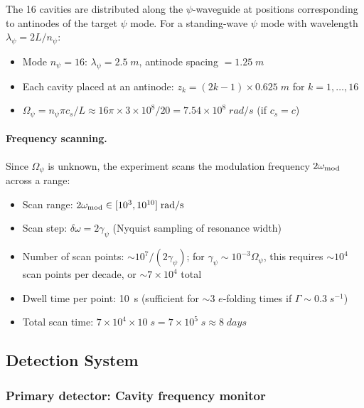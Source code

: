 \documentclass[aps,prd,twocolumn,superscriptaddress,floatfix,nofootinbib]{revtex4-2}
\newcommand{\Opsi}{\Omega_\psi}
\newcommand{\gpsi}{\gamma_\psi}
\begin{document}
The 16 cavities are distributed along the $\psi$-waveguide at
positions corresponding to antinodes of the target $\psi$ mode.
For a standing-wave $\psi$ mode with wavelength
$\lambda_\psi = 2L/n_\psi$:
\begin{itemize}[nosep]
\item Mode $n_\psi = 16$: $\lambda_\psi = 2.5\;\si{m}$,
antinode spacing $= 1.25\;\si{m}$
\item Each cavity placed at an antinode: $z_k = (2k-1)\times 0.625\;\si{m}$
for $k = 1, \ldots, 16$
\item $\Opsi = n_\psi\pi c_s/L \approx 16\pi \times 3\times10^8/20
= 7.54\times10^8\;\si{rad/s}$ (if $c_s = c$)
\end{itemize}

\paragraph{Frequency scanning.}
Since $\Opsi$ is unknown, the experiment scans the modulation frequency
$2\omega_{\rm mod}$ across a range:
\begin{itemize}[nosep]
\item Scan range: $2\omega_{\rm mod} \in [10^3, 10^{10}]\;\si{rad/s}$
\item Scan step: $\delta\omega = 2\gpsi$ (Nyquist sampling of
resonance width)
\item Number of scan points: $\sim 10^7/(2\gpsi)$; for
$\gpsi \sim 10^{-3}\Opsi$, this requires $\sim 10^4$ scan points
per decade, or $\sim 7\times10^4$ total
\item Dwell time per point: 10~s (sufficient for $\sim 3$ $e$-folding
times if $\Gamma \sim 0.3\;\si{s^{-1}}$)
\item Total scan time: $7\times10^4 \times 10\;\si{s} = 7\times10^5\;\si{s}
\approx 8\;\si{days}$
\end{itemize}

\subsection{Detection System}\label{sec:detection}

\subsubsection{Primary detector: Cavity frequency monitor}
\end{document}
